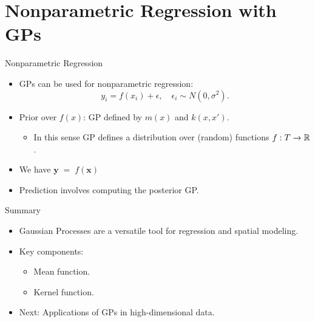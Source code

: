 \documentclass[11pt,handout,aspectratio=169]{beamer}
\begin{document}
\section{Nonparametric Regression with GPs}

\begin{frame}{Nonparametric Regression}
\begin{itemize}
    \item GPs can be used for nonparametric regression:
    \[
    y_i = f(x_i) + \epsilon, \quad \epsilon_i \sim {N}(0, \sigma^2).
    \]
    \item Prior over \( f(x) \): GP defined by \( m(x) \) and \( k(x, x') \).
    \begin{itemize}
    \item In this sense GP defines a distribution over (random) functions $f: T\to \mathbb R$.
    \end{itemize}
    \item We have $\mathbf y\;=\;f(\mathbf{x})$
    \item Prediction involves computing the posterior GP.
\end{itemize}
\end{frame}

%
%
%
%

\begin{frame}{Summary}
\begin{itemize}
    \item Gaussian Processes are a versatile tool for regression and spatial modeling.
    \item Key components:
    \begin{itemize}
        \item Mean function.
        \item Kernel function.
    \end{itemize}
    \item Next: Applications of GPs in high-dimensional data.
\end{itemize}
\end{frame}
\end{document}
